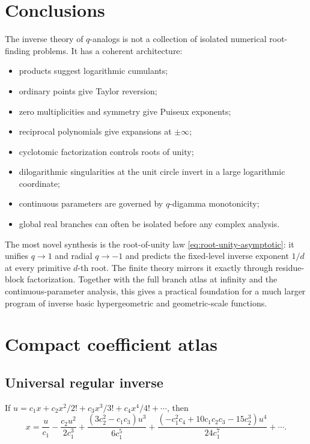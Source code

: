 \documentclass[11pt,oneside]{book}
\theoremstyle{definition}
\theoremstyle{remark}
\begin{document}
\chapter{Conclusions}
The inverse theory of $q$-analogs is not a collection of isolated numerical
root-finding problems.  It has a coherent architecture:
\begin{itemize}
\item products suggest logarithmic cumulants;
\item ordinary points give Taylor reversion;
\item zero multiplicities and symmetry give Puiseux exponents;
\item reciprocal polynomials give expansions at $\pm\infty$;
\item cyclotomic factorization controls roots of unity;
\item dilogarithmic singularities at the unit circle invert in a large
      logarithmic coordinate;
\item continuous parameters are governed by $q$-digamma monotonicity;
\item global real branches can often be isolated before any complex analysis.
\end{itemize}

The most novel synthesis is the root-of-unity law
\eqref{eq:root-unity-asymptotic}: it unifies $q\to1$ and radial $q\to-1$ and
predicts the fixed-level inverse exponent $1/d$ at every primitive $d$-th
root.  The finite theory mirrors it exactly through residue-block
factorization.  Together with the full branch atlas at infinity and the
continuous-parameter analysis, this gives a practical foundation for a much
larger program of inverse basic hypergeometric and geometric-scale functions.

\appendix

\chapter{Compact coefficient atlas}\label{app:atlas}

\section{Universal regular inverse}
If
$u=c_1x+c_2x^2/2!+c_3x^3/3!+c_4x^4/4!+\cdots$, then
\[
 x=\frac{u}{c_1}-\frac{c_2u^2}{2c_1^3}
 +\frac{(3c_2^2-c_1c_3)u^3}{6c_1^5}
 +\frac{(-c_1^2c_4+10c_1c_2c_3-15c_2^3)u^4}{24c_1^7}+\cdots.
\]
\end{document}

